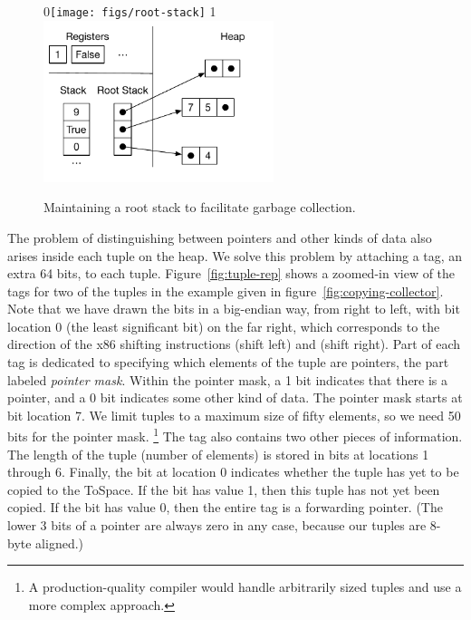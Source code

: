 \documentclass[7x10]{TimesAPriori_MIT}%
\def\racketEd{0}
\def\pythonEd{1}
\def\edition{1}
\newcommand{\racket}[1]{{\if\edition\racketEd{#1}\fi}}
\newcommand{\pythonColor}[0]{}
\newcommand{\python}[1]{{\if\edition\pythonEd\pythonColor #1\fi}}
\numberwithin{theorem}{chapter}
\numberwithin{definition}{chapter}
\numberwithin{equation}{chapter}
\begin{document}
\begin{figure}[tbp]
  \centering
  \begin{tcolorbox}[colback=white]
    \racket{\texttt{[image: figs/root-stack]}}
  \python{\includegraphics[width=0.60\textwidth]{figs/root-stack-python}}
  \end{tcolorbox}

  \caption{Maintaining a root stack to facilitate garbage collection.}
\label{fig:shadow-stack}
\end{figure}

The problem of distinguishing between pointers and other kinds of data
also arises inside each tuple on the heap. We solve this problem by
attaching a tag, an extra 64 bits, to each
tuple. Figure~\ref{fig:tuple-rep} shows a zoomed-in view of the tags for
two of the tuples in the example given in figure~\ref{fig:copying-collector}.
Note that we have drawn the bits in a big-endian way, from right to left,
with bit location 0 (the least significant bit) on the far right,
which corresponds to the direction of the x86 shifting instructions
 (shift left) and  (shift right). Part of each tag
is dedicated to specifying which elements of the tuple are pointers,
the part labeled \emph{pointer mask}. Within the pointer mask, a 1 bit
indicates that there is a pointer, and a 0 bit indicates some other kind of
data. The pointer mask starts at bit location 7. We limit tuples to a
maximum size of fifty elements, so we need 50 bits for the pointer
mask.%
%
\footnote{A production-quality compiler would handle
arbitrarily sized tuples and use a more complex approach.}
%
The tag also contains two other pieces of information. The length of
the tuple (number of elements) is stored in bits at locations 1 through
6. Finally, the bit at location 0 indicates whether the tuple has yet
to be copied to the ToSpace.  If the bit has value 1, then this tuple
has not yet been copied.  If the bit has value 0, then the entire tag
is a forwarding pointer. (The lower 3 bits of a pointer are always
zero in any case, because our tuples are 8-byte aligned.)
\end{document}
